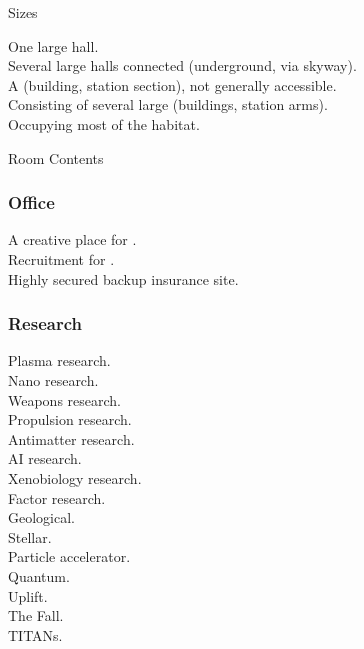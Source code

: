 \documentclass[a4]{article}
\begin{document}
Sizes

\starttableone
One large hall.\\
Several large halls connected (underground, via skyway).\\
A (building, station section), not generally accessible.\\
Consisting of several large (buildings, station arms).\\
Occupying most of the habitat.\\
\stoptableone



Room Contents

\starttableone
\stoptableone




\subsubsection{Office}

\starttableone
A creative place for .\\
Recruitment for .\\
Highly secured backup insurance site.\\
\stoptableone



\subsubsection{Research}


\starttableone
Plasma research.\\
Nano research.\\
Weapons research.\\
Propulsion research.\\
Antimatter research.\\
AI research.\\
Xenobiology research.\\
Factor research.\\
Geological.\\
Stellar.\\
Particle accelerator.\\
Quantum.\\
Uplift.\\
The Fall.\\
TITANs.\\
\stoptableone
\end{document}
